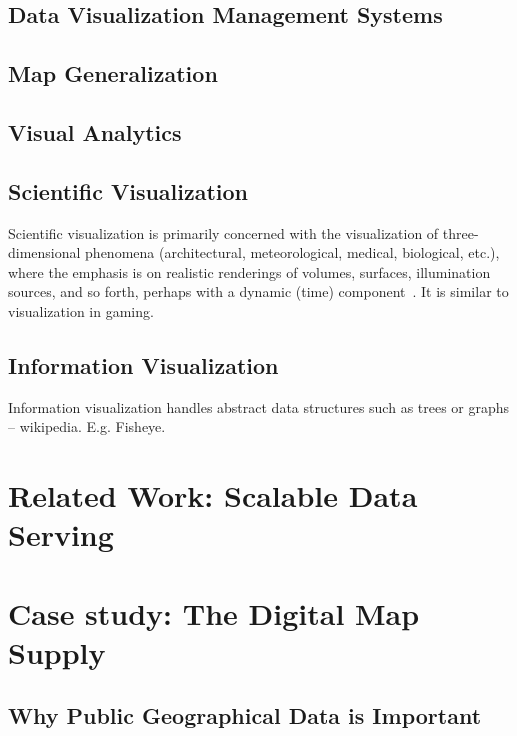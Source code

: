 \documentclass[11pt, oneside]{report}
\begin{document}
\section{Data Visualization Management Systems}

\section{Map Generalization}

\section{Visual Analytics}

\section{Scientific Visualization}
Scientific visualization is primarily concerned with the visualization of three-dimensional phenomena (architectural, meteorological, medical, biological, etc.), where the emphasis is on realistic renderings of volumes, surfaces, illumination sources, and so forth, perhaps with a dynamic (time) component~\cite{friendly2008milestones}. It is similar to visualization in gaming.

\section{Information Visualization}

Information visualization handles abstract data structures such as trees or graphs -- wikipedia. E.g. Fisheye.



\chapter{Related Work: Scalable Data Serving}



\chapter{Case study: The Digital Map Supply}
\label{chapter:case:study}

\section{Why Public Geographical Data is Important}
\end{document}
